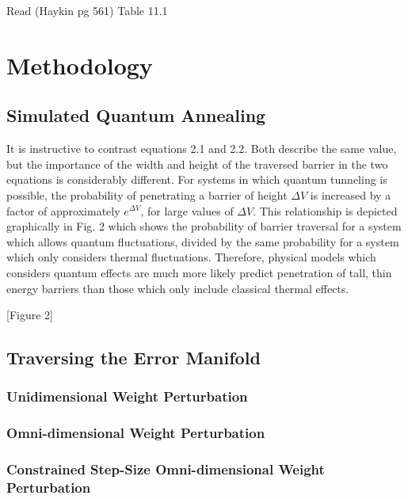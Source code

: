\documentclass[11pt]{afthesis}
\begin{document}
	
	Read (Haykin pg 561) Table 11.1
	
	
	\chapter{Methodology}
	
	\section{Simulated Quantum Annealing}
	
	It is instructive to contrast equations 2.1 and 2.2. Both describe the same value, but the importance of the width and height of the traversed barrier in the two equations is considerably different. For systems in which quantum tunneling is possible, the probability of penetrating a barrier of height \begin{math} \Delta V \end{math} is increased by a factor of approximately \begin{math} e^{\Delta V} \end{math}, for large values of \begin{math} \Delta V \end{math}. This relationship is depicted graphically in Fig. 2 which shows the probability of barrier traversal for a system which allows quantum fluctuations, divided by the same probability for a system which only considers thermal fluctuations. Therefore, physical models which considers quantum effects are much more likely predict penetration of tall, thin energy barriers than those which only include classical thermal effects.
	
	
	[Figure 2] 
	
	
	\section{Traversing the Error Manifold}
	
	\subsection{Unidimensional Weight Perturbation}
	
	\subsection{Omni-dimensional Weight Perturbation}
	
	\subsection{Constrained Step-Size Omni-dimensional Weight Perturbation}
	
\end{document}
